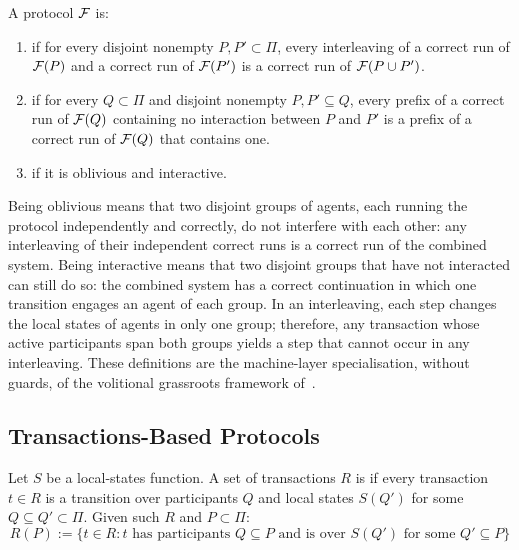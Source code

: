 \begin{definition}\label{definition:grassroots}
A protocol $\mathcal{F}$ is:
\begin{enumerate}
\item {} if for every disjoint nonempty $P, P' \subset \Pi$,
    every interleaving of a correct run of $\mathcal{F}(P)$ and a correct run of $\mathcal{F}(P')$ is a correct run of $\mathcal{F}(P \cup P')$.
\item {} if for every $Q \subset \Pi$ and disjoint nonempty $P, P' \subseteq Q$, every prefix of a correct run of $\mathcal{F}(Q)$ containing no interaction between $P$ and $P'$ is a prefix of a correct run of $\mathcal{F}(Q)$ that contains one.
\item {} if it is oblivious and interactive.
\end{enumerate}
\end{definition}

Being oblivious means that two disjoint groups of agents, each running the protocol independently and correctly, do not interfere with each other: any interleaving of their independent correct runs is a correct run of the combined system. Being interactive means that two disjoint groups that have not interacted can still do so: the combined system has a correct continuation in which one transition engages an agent of each group. In an interleaving, each step changes the local states of agents in only one group; therefore, any transaction whose active participants span both groups yields a step that cannot occur in any interleaving. These definitions are the machine-layer specialisation, without guards, of the volitional grassroots framework of~\cite{lewis2026volitional}.

\subsection{Transactions-Based Protocols}

\begin{definition}\label{definition:transactions-lsf}
Let $S$ be a local-states function. A set of transactions $R$ is  if every transaction $t \in R$ is a transition over participants $Q$ and local states $S(Q')$ for some $Q \subseteq Q' \subset \Pi$. Given such $R$ and $P \subset \Pi$:
$$R(P) := \{t \in R : t \text{ has participants } Q \subseteq P \text{ and is over } S(Q') \text{ for some } Q' \subseteq P\}$$
\end{definition}

